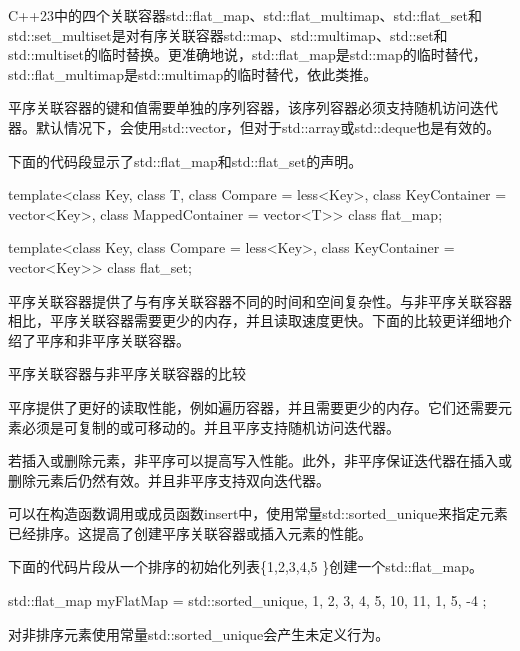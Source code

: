 C++23中的四个关联容器std::flat\_map、std::flat\_multimap、std::flat\_set和std::set\_multiset是对有序关联容器std::map、std::multimap、std::set和std::multiset的临时替换。更准确地说，std::flat\_map是std::map的临时替代，std::flat\_multimap是std::multimap的临时替代，依此类推。

平序关联容器的键和值需要单独的序列容器，该序列容器必须支持随机访问迭代器。默认情况下，会使用std::vector，但对于std::array或std::deque也是有效的。

下面的代码段显示了std::flat\_map和std::flat\_set的声明。

\begin{cpp}
template<class Key, class T,
	class Compare = less<Key>,
	class KeyContainer = vector<Key>, class MappedContainer = vector<T>>
class flat_map;

template<class Key,
	class Compare = less<Key>,
	class KeyContainer = vector<Key>>
class flat_set;
\end{cpp}

平序关联容器提供了与有序关联容器不同的时间和空间复杂性。与非平序关联容器相比，平序关联容器需要更少的内存，并且读取速度更快。下面的比较更详细地介绍了平序和非平序关联容器。


\begin{myTip}{平序关联容器与非平序关联容器的比较}

平序提供了更好的读取性能，例如遍历容器，并且需要更少的内存。它们还需要元素必须是可复制的或可移动的。并且平序支持随机访问迭代器。

若插入或删除元素，非平序可以提高写入性能。此外，非平序保证迭代器在插入或删除元素后仍然有效。并且非平序支持双向迭代器。
\end{myTip}



可以在构造函数调用或成员函数insert中，使用常量std::sorted\_unique来指定元素已经排序。这提高了创建平序关联容器或插入元素的性能。

下面的代码片段从一个排序的初始化列表\{1,2,3,4,5 \}创建一个std::flat\_map。

\begin{cpp}
std::flat_map myFlatMap = { std::sorted_unique, {1, 2, 3, 4, 5}, {10, 11, 1, 5, -4} };
\end{cpp}

对非排序元素使用常量std::sorted\_unique会产生未定义行为。













